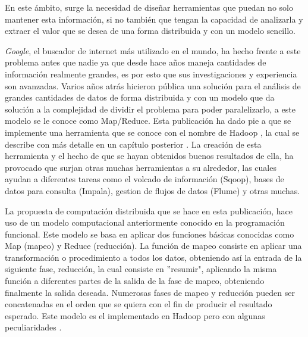 En este \'ambito, surge la necesidad de dise\~nar herramientas que puedan no solo mantener esta informaci\'on, si no también que tengan la capacidad de analizarla y extraer el valor que se desea de una forma distribuida y con un modelo sencillo. 

\textit{Google}, el buscador de internet m\'as utilizado en el mundo, ha hecho frente a este problema antes que nadie ya que desde hace a\~nos maneja cantidades de información realmente grandes, es por esto que sus investigaciones y experiencia son avanzadas. Varios a\~nos atrás hicieron p\'ublica \cite{paper-mapreduce} una solución para el an\'alisis de grandes cantidades de datos de forma distribuida y con un modelo que da soluci\'on a la complejidad de dividir el problema para poder paralelizarlo, a este modelo se le conoce como Map/Reduce. Esta publicación ha dado pie a que se implemente una herramienta que se conoce con el nombre de Hadoop \cite{hadoop}, la cual se describe con m\'as detalle en un cap\'itulo posterior . La creaci\'on de esta herramienta y el hecho de que se hayan obtenidos buenos resultados de ella, ha provocado que surjan otras muchas herramientas a su alrededor, las cuales ayudan a diferentes tareas como el volcado de información (Sqoop), bases de datos para consulta (Impala), gestion de flujos de datos (Flume) y otras muchas.

La propuesta de computación distribuida que se hace en esta publicación, hace uso de un modelo computacional anteriormente conocido en la programación funcional. Este modelo se basa en aplicar dos funciones básicas conocidas como Map (mapeo) y Reduce (reducci\'on). La función de mapeo consiste en aplicar una transformación o procedimiento a todos los datos, obteniendo así la entrada de la siguiente fase, reducción, la cual consiste en ''resumir", aplicando la misma función a diferentes partes de la salida de la fase de mapeo, obteniendo finalmente la salida deseada. Numerosas fases de mapeo y reducción pueden ser concatenadas en el orden que se quiera con el fin de producir el resultado esperado. Este modelo es el implementado en Hadoop pero con algunas peculiaridades .
